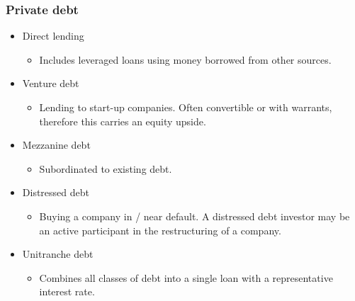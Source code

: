 \documentclass[../notes_compiled.tex]{subfiles}
\begin{document}
\subsubsection{Private debt}
\begin{itemize}
\item Direct lending
\begin{itemize}
\item Includes leveraged loans using money borrowed from other sources.
\end{itemize}
\item Venture debt
\begin{itemize}
\item Lending to start-up companies. Often convertible or with warrants, therefore this carries an equity upside.
\end{itemize}
\item Mezzanine debt
\begin{itemize}
\item Subordinated to existing debt.
\end{itemize}
\item Distressed debt
\begin{itemize}
\item Buying a company in / near default. A distressed debt investor may be an active participant in the restructuring of a company.
\end{itemize}
\item Unitranche debt
\begin{itemize}
\item Combines all classes of debt into a single loan with a representative interest rate.
\end{itemize}
\end{itemize}
\end{document}

